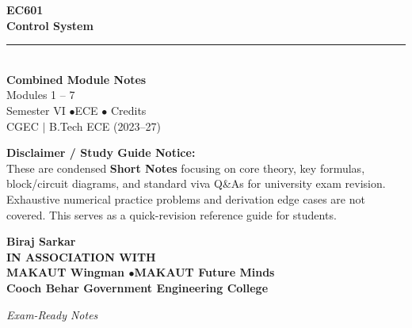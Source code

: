 \documentclass[12pt,a4paper]{article}
\begin{document}
\thispagestyle{empty}


\vspace*{1.0cm}
\begin{center}
  {\Huge\bfseries\color{myred} EC601}\\[10pt]
  {\LARGE\bfseries\color{mydark} Control System}\\[20pt]
  {\color{myred}\rule{0.7\linewidth}{1.5pt}}\\[18pt]
  {\Large\color{myteal}\textbf{Combined Module Notes}}\\[8pt]
  {\large\color{mydark} Modules 1 -- 7}\\[40pt]
  {\normalsize\color{mydark} Semester VI \quad$\bullet$\quad ECE \quad$\bullet$ Credits}\\[12pt]
  {\normalsize\color{mydark} CGEC \;$|$\; B.Tech ECE (2023--27)}
\end{center}
\vspace{1.0cm}
\begin{center}
  \begin{tcolorbox}[colback=mygray, colframe=mgframe, boxrule=0.5pt, arc=3pt, width=0.85\linewidth]
    \centering\small\color{mydark}
    \textbf{Disclaimer / Study Guide Notice:}\\
    These are condensed \textbf{Short Notes} focusing on core theory, key formulas, block/circuit diagrams, and standard viva Q\&As for university exam revision. Exhaustive numerical practice problems and derivation edge cases are not covered. This serves as a quick-revision reference guide for students.
  \end{tcolorbox}
\end{center}
\vfill
\vspace{0.6cm}
\begin{center}
  {\large\bfseries\color{mypurple} Biraj Sarkar}\\[16pt]
  {\footnotesize\color{watermark}\textbf{IN ASSOCIATION WITH}}\\[8pt]
  {\small\bfseries\color{mydark} MAKAUT Wingman \quad$\bullet$\quad MAKAUT Future Minds}\\[12pt]
  {\large\bfseries\color{myteal} Cooch Behar Government Engineering College}
\end{center}
\vfill
\begin{center}{\small\color{watermark}\textit{Exam-Ready Notes}}\end{center}
\clearpage
\end{document}

